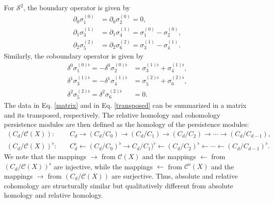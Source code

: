 \begin{example}{\cite[\S 2.6, Example]{de2011dualities}}
	For $\mathcal{S}^{2}$, the boundary operator is given by
	\begin{align}
		\label{matrix}
		\partial_0\sigma^{(0)}_{1} & = \partial_0\sigma^{(0)}_{2} = 0, \nonumber\\
		\partial_1\sigma_{3}^{(1)} & = \partial_1\sigma_{4}^{(1)} = \sigma_{1}^{(0)}-\sigma_{2}^{(0)}, \nonumber\\
		\partial_2\sigma_{5}^{(2)} & = \partial_2\sigma_{6}^{(2)} = \sigma_{3}^{(1)} - \sigma_{4}^{(1)}.
	\end{align}
	Similarly, the coboundary operator is given by
	\begin{align}
		\label{transposed}
		\delta^0\sigma_{1}^{(0)\flat} = -\delta^0\sigma_{2}^{(0)\flat} & = \sigma_{3}^{(1)\flat} + \sigma_{4}^{(1)\flat}, \nonumber\\
		\delta^1\sigma_{3}^{(1)\flat} = -\delta^1\sigma_{4}^{(1)\flat} & = \sigma_{5}^{(2)\flat} + \sigma_{6}^{(2)\flat}, \nonumber\\
		\delta^2\sigma_{5}^{(2)\flat} = \delta^2\sigma_{6}^{(2)\flat}  & = 0.
	\end{align}
	The data in Eq. \ref{matrix} and in Eq. \ref{transposed} can be summarized in a matrix and its transposed, respectively. The relative homology and cohomology persistence modules are then defined as the homology of the persistence modules:
	\begin{align}
		(C_{d}/\mathcal{C}(X)):         & \quad C_{d} \rightarrow (C_{d}/C_{0}) \to (C_{d}/C_{1}) \rightarrow (C_{d}/C_{2}) \rightarrow \cdots \rightarrow (C_{d}/C_{d-1}),                             \\
		(C_{d}/\mathcal{C}(X))^{\flat}: & \quad C_{d}^{\flat} \leftarrow (C_{d}/C_{0})^{\flat} \to C_{d}/C_{1})^{\flat} \leftarrow (C_{d}/C_{2})^{\flat} \leftarrow \cdots \leftarrow (C_{d}/C_{d-1})^{\flat}.
	\end{align}
	We note that the mappings $\rightarrow$ from $\mathcal{C}(X)$ and the mappings $\leftarrow$
	from $(C_{d}/\mathcal{C}(X))^{\flat}$ are injective, while the mappings
	$\leftarrow$ from $\mathcal{C}^{\flat}(X)$ and the mappings $\rightarrow$ from
	$(C_{d}/\mathcal{C}(X))$ are surjective. Thus, absolute and relative cohomology
	are structurally similar but qualitatively different from absolute homology
	and relative homology.
\end{example}

